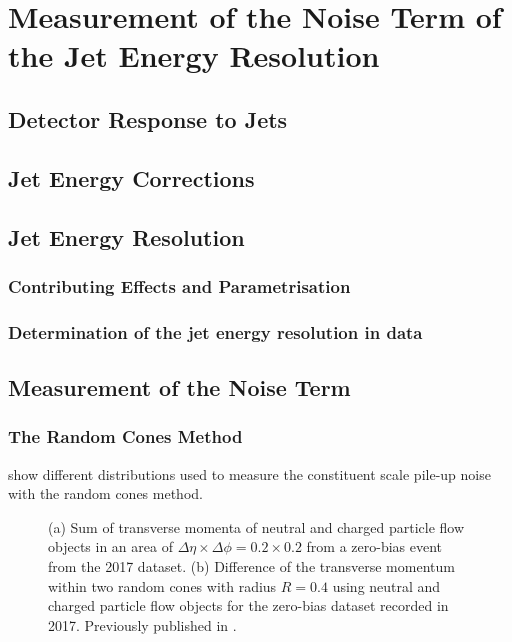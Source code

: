 \chapter{Measurement of the Noise Term of the Jet Energy Resolution}
\label{chap:calibration}

\section{Detector Response to Jets}

\section{Jet Energy Corrections}



\section{Jet Energy Resolution}


\subsection{Contributing Effects and Parametrisation}


\subsection{Determination of the jet energy resolution in data}



\section{Measurement of the Noise Term}



\subsection{The Random Cones Method}

 show different distributions used to measure the constituent scale pile-up noise with the random cones method.

\begin{figure}
    \caption{(a) Sum of transverse momenta of neutral and charged particle flow objects in an area of $\Delta \eta \times \Delta \phi = 0.2 \times 0.2$ from a zero-bias event from the 2017 dataset. (b) Difference of the transverse momentum within two random cones with radius $R = 0.4$ using neutral and charged particle flow objects for the zero-bias dataset recorded in 2017.
        Previously published in .}
    \label{fig:random-cones-balance}
\end{figure}

